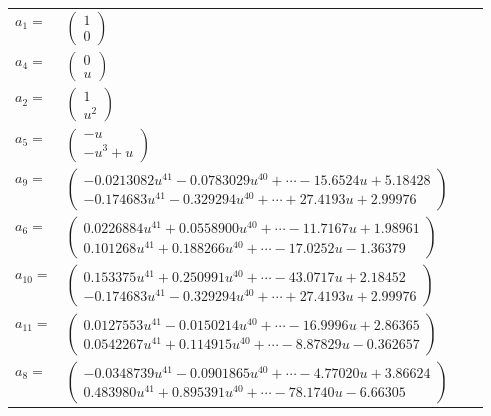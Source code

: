 \documentclass[1p]{elsarticle_modified}
\theoremstyle{definition}
\begin{document}
\begin{tabular}{m{7pt} m{180pt} m{7pt} m{180pt} }
\flushright $a_{1}=$&$\begin{pmatrix}1\\0\end{pmatrix}$ \\
\flushright $a_{4}=$&$\begin{pmatrix}0\\u\end{pmatrix}$ \\
\flushright $a_{2}=$&$\begin{pmatrix}1\\u^2\end{pmatrix}$ \\
\flushright $a_{5}=$&$\begin{pmatrix}- u\\- u^3+u\end{pmatrix}$ \\
\flushright $a_{9}=$&$\begin{pmatrix}-0.0213082 u^{41}-0.0783029 u^{40}+\cdots-15.6524 u+5.18428\\-0.174683 u^{41}-0.329294 u^{40}+\cdots+27.4193 u+2.99976\end{pmatrix}$ \\
\flushright $a_{6}=$&$\begin{pmatrix}0.0226884 u^{41}+0.0558900 u^{40}+\cdots-11.7167 u+1.98961\\0.101268 u^{41}+0.188266 u^{40}+\cdots-17.0252 u-1.36379\end{pmatrix}$ \\
\flushright $a_{10}=$&$\begin{pmatrix}0.153375 u^{41}+0.250991 u^{40}+\cdots-43.0717 u+2.18452\\-0.174683 u^{41}-0.329294 u^{40}+\cdots+27.4193 u+2.99976\end{pmatrix}$ \\
\flushright $a_{11}=$&$\begin{pmatrix}0.0127553 u^{41}-0.0150214 u^{40}+\cdots-16.9996 u+2.86365\\0.0542267 u^{41}+0.114915 u^{40}+\cdots-8.87829 u-0.362657\end{pmatrix}$ \\
\flushright $a_{8}=$&$\begin{pmatrix}-0.0348739 u^{41}-0.0901865 u^{40}+\cdots-4.77020 u+3.86624\\0.483980 u^{41}+0.895391 u^{40}+\cdots-78.1740 u-6.66305\end{pmatrix}$ \\

\end{tabular}
\end{document}
